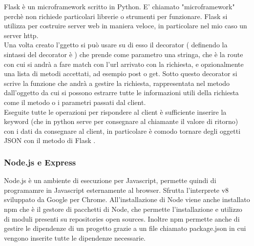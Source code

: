 \noindent
Flask è un microframework scritto in Python. E' chiamato "microframework" perchè non richiede particolari librerie o strumenti per funzionare. Flask si utilizza per costruire server web in maniera veloce, in particolare nel mio caso un server http.\\
Una volta creato l'ggetto  si può usare su di esso il decorator  ( definendo  la sintassi del decorator è ) che prende come parametro una stringa, che è la route con cui si andrà a fare match con l'url arrivato con la richiesta, e opzionalmente una lista di metodi accettati, ad esempio post o get. Sotto questo decorator si scrive la funzione che andrà a gestire la richiesta, rappresentata nel metodo dall'oggetto  da cui si possono estrarre tutte le informazioni utili della richiesta come il metodo o i parametri passati dal client.\\
Eseguite tutte le operazioni per rispondere al client è sufficiente inserire la keyword  (che in python serve per consegnare al chiamante il valore di ritorno) con i dati da consegnare al client, in particolare è comodo tornare degli oggetti JSON con il metodo di Flask .



\subsubsection{Node.js e Express}
Node.js è un ambiente di esecuzione per Javascript, permette quindi di programamre in Javascript esternamente al browser. Sfrutta l'interprete v8 sviluppato da Google per Chrome. All'installazione di Node viene anche installato npm che è il gestore di pacchetti di Node, che permette l'installazione e utilizzo di moduli presenti su repositories open sources. Inoltre npm permette anche di gestire le dipendenze di un progetto grazie a un file chiamato package.json in cui vengono inserite tutte le dipendenze necessarie.\\

